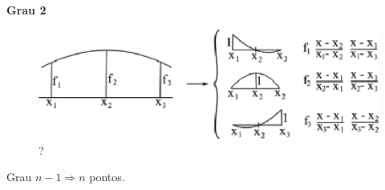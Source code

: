 \begin{enumerate}
\textbf{Grau 2}

\begin{figure}[htb]
 \centering
 \includegraphics[scale=1.0]{capitulos/capitulo2/figuras/roteiro_da_aula6.eps}
 \caption{?}
 \label{fig:roteiro_da_aula6}
\end{figure}

Grau $n-1 \Rightarrow n$ pontos.

\end{enumerate}
